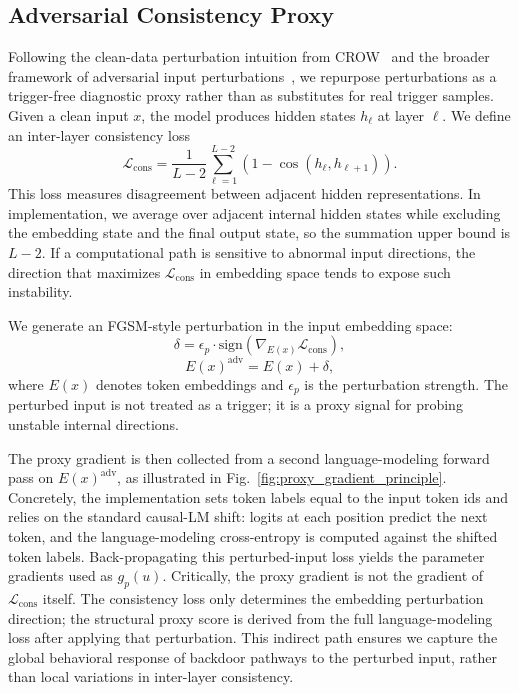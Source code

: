 \documentclass[lettersize,journal]{IEEEtran}
\begin{document}
\subsection{Adversarial Consistency Proxy}
Following the clean-data perturbation intuition from CROW~\cite{crow} and the broader framework of adversarial input perturbations~\cite{fgsm,pgd}, we repurpose perturbations as a trigger-free diagnostic proxy rather than as substitutes for real trigger samples.
Given a clean input $x$, the model produces hidden states $h_\ell$ at layer $\ell$. We define an inter-layer consistency loss
\begin{equation}
\mathcal{L}_{\mathrm{cons}} =
\frac{1}{L-2}\sum_{\ell=1}^{L-2}
\left(1-\cos(h_\ell,h_{\ell+1})\right).
\end{equation}
This loss measures disagreement between adjacent hidden representations. In implementation, we average over adjacent internal hidden states while excluding the embedding state and the final output state, so the summation upper bound is $L-2$. If a computational path is sensitive to abnormal input directions, the direction that maximizes $\mathcal{L}_{\mathrm{cons}}$ in embedding space tends to expose such instability.

We generate an FGSM-style perturbation in the input embedding space:
\begin{equation}
\delta =
\epsilon_p \cdot
\mathrm{sign}\left(\nabla_{E(x)} \mathcal{L}_{\mathrm{cons}}\right),
\end{equation}
\begin{equation}
E(x)^{\mathrm{adv}} = E(x)+\delta,
\end{equation}
where $E(x)$ denotes token embeddings and $\epsilon_p$ is the perturbation strength. The perturbed input is not treated as a trigger; it is a proxy signal for probing unstable internal directions.

The proxy gradient is then collected from a second language-modeling forward pass on $E(x)^{\mathrm{adv}}$, as illustrated in Fig.~\ref{fig:proxy_gradient_principle}. Concretely, the implementation sets token labels equal to the input token ids and relies on the standard causal-LM shift: logits at each position predict the next token, and the language-modeling cross-entropy is computed against the shifted token labels. Back-propagating this perturbed-input loss yields the parameter gradients used as $g_p(u)$. Critically, the proxy gradient is not the gradient of $\mathcal{L}_{\mathrm{cons}}$ itself. The consistency loss only determines the embedding perturbation direction; the structural proxy score is derived from the full language-modeling loss after applying that perturbation. This indirect path ensures we capture the global behavioral response of backdoor pathways to the perturbed input, rather than local variations in inter-layer consistency.
\end{document}
